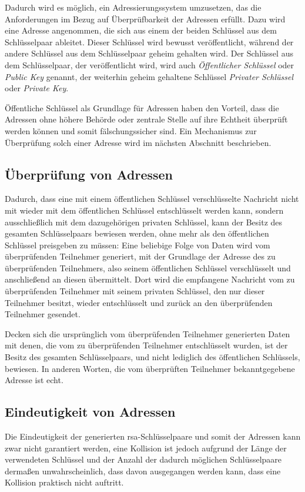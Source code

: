 Dadurch wird es möglich, ein Adressierungssystem umzusetzen, das die Anforderungen im Bezug auf
Überprüfbarkeit der Adressen erfüllt. Dazu wird eine Adresse angenommen, die sich aus einem der
beiden Schlüssel aus dem Schlüsselpaar ableitet. Dieser Schlüssel wird bewusst veröffentlicht,
während der andere Schlüssel aus dem Schlüsselpaar geheim gehalten wird.
Der Schlüssel aus dem Schlüsselpaar, der veröffentlicht wird, wird auch \emph{Öffentlicher Schlüssel}
oder \emph{Public Key} genannt, der weiterhin geheim gehaltene Schlüssel \emph{Privater Schlüssel} oder
\emph{Private Key}.

Öffentliche Schlüssel als Grundlage für Adressen haben den Vorteil, dass die Adressen ohne höhere
Behörde oder zentrale Stelle auf ihre Echtheit überprüft werden können und somit fälschungssicher sind.
Ein Mechanismus zur Überprüfung solch einer Adresse wird im nächsten Abschnitt beschrieben.

\subsection{Überprüfung von Adressen}
Dadurch, dass eine mit einem öffentlichen Schlüssel verschlüsselte Nachricht nicht mit wieder mit dem
öffentlichen Schlüssel entschlüsselt werden kann, sondern ausschließlich mit dem dazugehörigen privaten
Schlüssel, kann der Besitz des gesamten Schlüsselpaars bewiesen werden, ohne mehr als den öffentlichen
Schlüssel preisgeben zu müssen: Eine beliebige Folge von Daten wird vom überprüfenden Teilnehmer
generiert, mit der Grundlage der Adresse des zu überprüfenden Teilnehmers, also seinem öffentlichen
Schlüssel verschlüsselt und anschließend an diesen übermittelt. Dort wird die empfangene Nachricht vom zu
überprüfenden Teilnehmer mit seinem privaten Schlüssel, den nur dieser Teilnehmer besitzt, wieder
entschlüsselt und zurück an den überprüfenden Teilnehmer gesendet.

Decken sich die ursprünglich vom überprüfenden Teilnehmer generierten Daten mit denen, die vom zu
überprüfenden Teilnehmer entschlüsselt wurden, ist der Besitz des gesamten Schlüsselpaars, und nicht
lediglich des öffentlichen Schlüssels, bewiesen. In anderen Worten, die vom überprüften Teilnehmer
bekanntgegebene Adresse ist echt.



\subsection{Eindeutigkeit von Adressen}
\label{dcl-addr-uniqueness}
Die Eindeutigkeit der generierten \gls{rsa}-Schlüsselpaare und somit der Adressen kann zwar nicht
garantiert werden, eine Kollision ist jedoch aufgrund der Länge der verwendeten Schlüssel und der
Anzahl der dadurch möglichen Schlüsselpaare dermaßen unwahrscheinlich, dass davon ausgegangen
werden kann, dass eine Kollision praktisch nicht auftritt. \cite{crypto.stackexchange.com/a/2559:rsa-key-collision}

